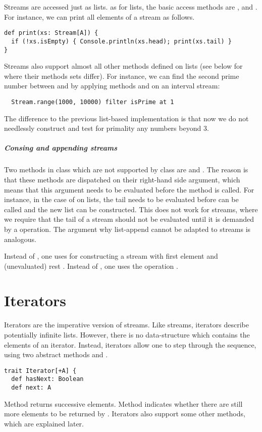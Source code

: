 {Streams are accessed just as lists. as for lists, the basic access
methods are ,  and . For instance,
we can print all elements of a stream as follows.
\begin{lstlisting}
def print(xs: Stream[A]) {
  if (!xs.isEmpty) { Console.println(xs.head); print(xs.tail) }
}
\end{lstlisting}
Streams also support almost all other methods defined on lists (see
below for where their methods sets differ). For instance, we can find
the second prime number between  and  by applying methods
 and  on an interval stream:
\begin{lstlisting}
  Stream.range(1000, 10000) filter isPrime at 1
\end{lstlisting}
The difference to the previous list-based implementation is that now
we do not needlessly construct and test for primality any numbers
beyond 3.

\paragraph{Consing and appending streams} Two methods in class 
which are not supported by class  are \code{::} and
\code{:::}.  The reason is that these methods are dispatched on their
right-hand side argument, which means that this argument needs to be
evaluated before the method is called. For instance, in the case of
 on lists, the tail  needs to be evaluated
before \code{::} can be called and the new list can be constructed.
This does not work for streams, where we require that the tail of a
stream should not be evaluated until it is demanded by a  operation.
The argument why list-append \code{:::} cannot be adapted to streams is analogous.

Instead of , one uses  for
constructing a stream with first element  and (unevaluated)
rest .  Instead of , one uses the operation
.  

\chapter{Iterators}

Iterators are the imperative version of streams. Like streams,
iterators describe potentially infinite lists. However, there is no
data-structure which contains the elements of an iterator. Instead, 
iterators allow one to step through the sequence, using two abstract methods  and .
\begin{lstlisting}
trait Iterator[+A] {
  def hasNext: Boolean
  def next: A
\end{lstlisting}
Method  returns successive elements.  Method 
indicates whether there are still more elements to be returned by
. Iterators also support some other methods, which are
explained later.

}
